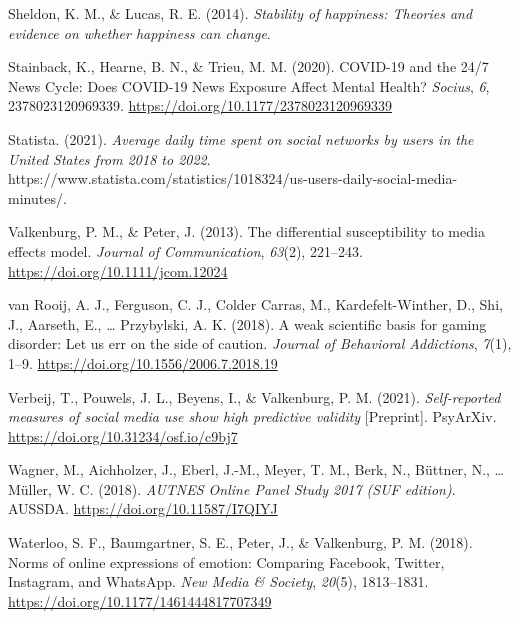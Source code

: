 \documentclass[
  man,mask]{apa6}
\newlength{\cslhangindent}
\newlength{\cslentryspacingunit} %
\newenvironment{CSLReferences}[2] %
 {%
  \setlength{\parindent}{0pt}
  \ifodd #1
  \let\oldpar\par
  \def\par{\hangindent=\cslhangindent\oldpar}
  \fi
  \setlength{\parskip}{#2\cslentryspacingunit}
 }%
 {}
\begin{document}
\begin{CSLReferences}{1}{0}
\leavevmode{}%
Sheldon, K. M., \& Lucas, R. E. (2014). \emph{Stability of happiness: Theories and evidence on whether happiness can change}.

\leavevmode{}%
Stainback, K., Hearne, B. N., \& Trieu, M. M. (2020). {COVID-19} and the 24/7 {News Cycle}: {Does COVID-19 News Exposure Affect Mental Health}? \emph{Socius}, \emph{6}, 2378023120969339. \url{https://doi.org/10.1177/2378023120969339}

\leavevmode{}%
Statista. (2021). \emph{Average daily time spent on social networks by users in the {United States} from 2018 to 2022}. https://www.statista.com/statistics/1018324/us-users-daily-social-media-minutes/.

\leavevmode{}%
Valkenburg, P. M., \& Peter, J. (2013). The differential susceptibility to media effects model. \emph{Journal of Communication}, \emph{63}(2), 221--243. \url{https://doi.org/10.1111/jcom.12024}

\leavevmode{}%
van Rooij, A. J., Ferguson, C. J., Colder Carras, M., Kardefelt-Winther, D., Shi, J., Aarseth, E., \ldots{} Przybylski, A. K. (2018). A weak scientific basis for gaming disorder: {Let} us err on the side of caution. \emph{Journal of Behavioral Addictions}, \emph{7}(1), 1--9. \url{https://doi.org/10.1556/2006.7.2018.19}

\leavevmode{}%
Verbeij, T., Pouwels, J. L., Beyens, I., \& Valkenburg, P. M. (2021). \emph{Self-reported measures of social media use show high predictive validity} {[}Preprint{]}. {PsyArXiv}. \url{https://doi.org/10.31234/osf.io/c9bj7}

\leavevmode{}%
Wagner, M., Aichholzer, J., Eberl, J.-M., Meyer, T. M., Berk, N., Büttner, N., \ldots{} Müller, W. C. (2018). \emph{{AUTNES Online Panel Study} 2017 ({SUF} edition)}. {AUSSDA}. \url{https://doi.org/10.11587/I7QIYJ}

\leavevmode{}%
Waterloo, S. F., Baumgartner, S. E., Peter, J., \& Valkenburg, P. M. (2018). Norms of online expressions of emotion: {Comparing Facebook}, {Twitter}, {Instagram}, and {WhatsApp}. \emph{New Media \& Society}, \emph{20}(5), 1813--1831. \url{https://doi.org/10.1177/1461444817707349}


\end{CSLReferences}
\end{document}
